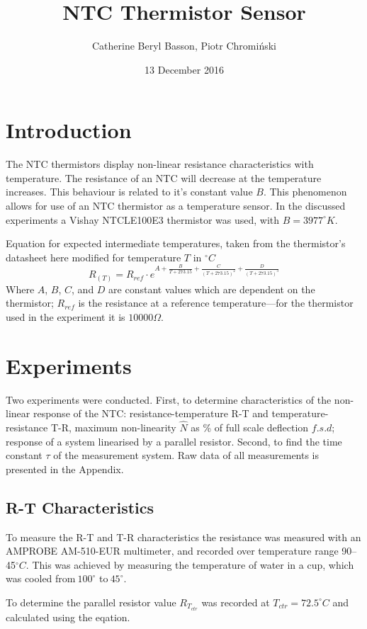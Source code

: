 \documentclass[a4,11pt]{article}
\begin{document}
\title{NTC Thermistor Sensor}
\author{Catherine Beryl Basson, Piotr Chromi\'nski}
\date{13 December 2016}
\maketitle
\twocolumn
\section{Introduction}

The NTC thermistors display non-linear resistance characteristics with temperature. The resistance of an NTC will decrease at the temperature increases. This behaviour is related to it's constant value $B$. This phenomenon allows for use of an NTC thermistor as a temperature sensor. In the discussed experiments a Vishay NTCLE100E3 thermistor was used, with $B=3977^{\circ}K$.

Equation for expected intermediate temperatures, taken from the thermistor's datasheet here modified for temperature $T$ in $^{\circ}C$
$$R_{(T)}=R_{ref}\cdot e^{A+\frac{B}{T+273.15}+\frac{C}{(T+273.15)^2}+\frac{D}{(T+273.15)^3}}$$
Where $A$, $B$, $C$, and $D$ are constant values which are dependent on the thermistor; $R_{ref}$ is the resistance at a reference temperature---for the thermistor used in the experiment it is $10000\Omega$.

\section{Experiments}
Two experiments were conducted. First, to determine characteristics of the non-linear response of the NTC: resistance-temperature R-T and temperature-resistance T-R, maximum non-linearity $\hat N$ as \% of full scale deflection $f.s.d$; response of a system linearised by a parallel resistor. Second, to find the time constant $\tau$ of the measurement system. Raw data of all measurements is presented in the Appendix.
\subsection{R-T Characteristics}

To measure the R-T and T-R characteristics the resistance was measured with an AMPROBE AM-510-EUR multimeter, and recorded over temperature range 90--45$^{\circ}C$. This was achieved by measuring the temperature of water in a cup, which was cooled from$~100^{\circ}$ to$~45^{\circ}$.

To determine the parallel resistor value $R_{T_{ctr}}$ was recorded at $T_{ctr}=72.5^{\circ}C$ and calculated using the eqation.
\end{document}

